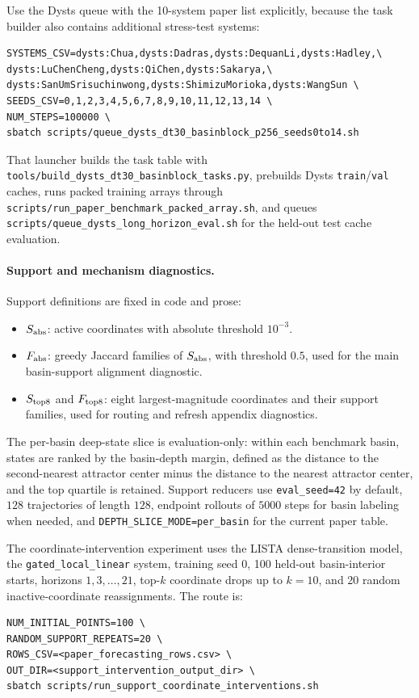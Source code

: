 Use the Dysts queue with the 10-system paper list explicitly, because the task
builder also contains additional stress-test systems:
\begin{verbatim}
SYSTEMS_CSV=dysts:Chua,dysts:Dadras,dysts:DequanLi,dysts:Hadley,\
dysts:LuChenCheng,dysts:QiChen,dysts:Sakarya,\
dysts:SanUmSrisuchinwong,dysts:ShimizuMorioka,dysts:WangSun \
SEEDS_CSV=0,1,2,3,4,5,6,7,8,9,10,11,12,13,14 \
NUM_STEPS=100000 \
sbatch scripts/queue_dysts_dt30_basinblock_p256_seeds0to14.sh
\end{verbatim}

That launcher builds the task table with
\texttt{tools/build\_dysts\_dt30\_basinblock\_tasks.py}, prebuilds Dysts
\texttt{train}/\texttt{val} caches, runs packed training arrays through
\texttt{scripts/run\_paper\_benchmark\_packed\_array.sh}, and queues
\texttt{scripts/queue\_dysts\_long\_horizon\_eval.sh} for the held-out test
cache evaluation.

\paragraph{Support and mechanism diagnostics.}
Support definitions are fixed in code and prose:
\begin{itemize}
  \item \(S_{\rm abs}\): active coordinates with absolute threshold \(10^{-3}\).
  \item \(F_{\rm abs}\): greedy Jaccard families of \(S_{\rm abs}\), with
  threshold \(0.5\), used for the main basin-support alignment diagnostic.
  \item \(S_{\rm top8}\) and \(F_{\rm top8}\): eight largest-magnitude
  coordinates and their support families, used for routing and refresh
  appendix diagnostics.
\end{itemize}

The per-basin deep-state slice is evaluation-only: within each benchmark basin,
states are ranked by the basin-depth margin, defined as the distance to the
second-nearest attractor center minus the distance to the nearest attractor
center, and the top quartile is retained. Support reducers use
\texttt{eval\_seed=42} by default, \(128\) trajectories of length \(128\),
endpoint rollouts of \(5000\) steps for basin labeling when needed, and
\texttt{DEPTH\_SLICE\_MODE=per\_basin} for the current paper table.

The coordinate-intervention experiment uses the LISTA dense-transition model,
the \texttt{gated\_local\_linear} system, training seed 0, 100 held-out
basin-interior starts, horizons \(1,3,\ldots,21\), top-\(k\) coordinate drops
up to \(k=10\), and 20 random inactive-coordinate reassignments. The route is:
\begin{verbatim}
NUM_INITIAL_POINTS=100 \
RANDOM_SUPPORT_REPEATS=20 \
ROWS_CSV=<paper_forecasting_rows.csv> \
OUT_DIR=<support_intervention_output_dir> \
sbatch scripts/run_support_coordinate_interventions.sh
\end{verbatim}

